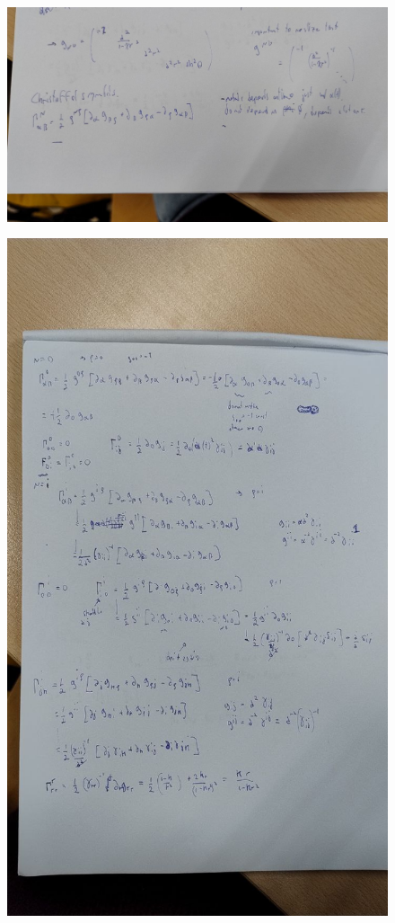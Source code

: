 \begin{figure}[h]
\centering
\includegraphics[width=\linewidth]{imm/lec23_2_1.jpg}
\caption{}
\label{imm:lec23_2_1.jpg}
\end{figure}
\begin{figure}[h]
\centering
\includegraphics[width=\linewidth]{imm/lec23_2_2.jpg}
\caption{}
\label{imm:lec23_2_2.jpg}
\end{figure}
